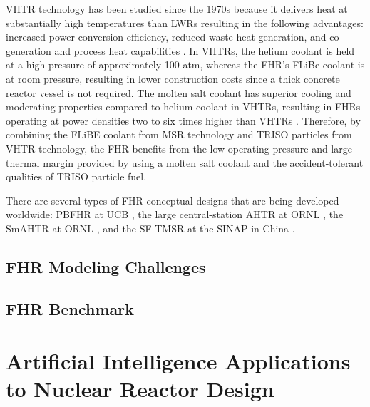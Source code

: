 \gls{VHTR} technology has been studied since the 1970s because it delivers 
heat at substantially high temperatures than \glspl{LWR} resulting in 
the following advantages: increased power conversion efficiency, reduced 
waste heat generation, and co-generation and process heat capabilities 
\cite{scarlat_design_2014}. 
In \glspl{VHTR}, the helium coolant is held at a high pressure of approximately 
100 atm, whereas the \gls{FHR}'s FLiBe coolant is at room pressure, resulting in lower 
construction costs since a thick concrete reactor vessel is not required.
The molten salt coolant has superior cooling and moderating properties compared 
to helium coolant in \glspl{VHTR}, resulting in \glspl{FHR} operating at 
power densities two to six times higher than  \glspl{VHTR} 
\cite{scarlat_design_2014,forsberg_fluoride-salt-cooled_2012}.
Therefore, by combining the FLiBE coolant from \gls{MSR} technology and 
\gls{TRISO} particles from \gls{VHTR} technology, the \gls{FHR} benefits from 
the low operating pressure and large thermal margin provided by using a molten 
salt coolant and the accident-tolerant qualities of \gls{TRISO} particle fuel. 

There are several types of \gls{FHR} conceptual designs that are being developed 
worldwide: \gls{PBFHR} at UCB \cite{scarlat_current_2014,krumwiede_three-dimensional_2013}, 
the large central-station \gls{AHTR} at \gls{ORNL} \cite{holcomb_core_2011, varma_ahtr_2012}, 
the \gls{SmAHTR} at ORNL \cite{greene_pre-conceptual_2010}, and the \gls{SF-TMSR}
at the \gls{SINAP} in China \cite{liu_preliminary_2016}. 

\subsection{FHR Modeling Challenges}

\subsection{FHR Benchmark}

\section{Artificial Intelligence Applications to Nuclear Reactor Design}